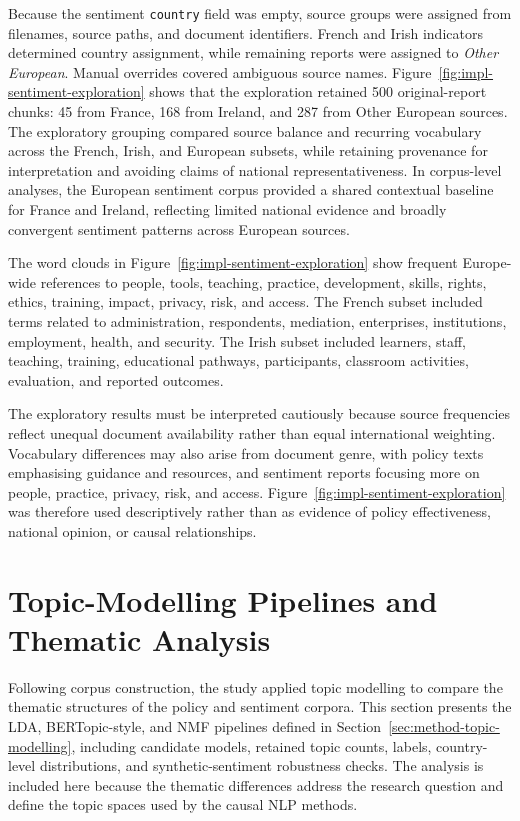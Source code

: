 Because the sentiment \texttt{country} field was empty, source groups were assigned
from filenames, source paths, and document identifiers. French and Irish
indicators determined country assignment, while remaining reports were assigned
to \textit{Other European}. Manual overrides covered ambiguous source names.
Figure~\ref{fig:impl-sentiment-exploration} shows that the exploration retained
500 original-report chunks: 45 from France, 168 from Ireland, and 287 from
Other European sources. The exploratory grouping compared
source balance and recurring vocabulary across the French, Irish, and
European subsets, while retaining provenance for interpretation and avoiding
claims of national representativeness. In corpus-level analyses, the European
sentiment corpus provided a shared contextual baseline for France and Ireland,
reflecting limited national evidence and broadly convergent sentiment patterns
across European sources.

The word clouds in Figure~\ref{fig:impl-sentiment-exploration} show frequent
Europe-wide references to people, tools, teaching, practice, development, skills,
rights, ethics, training, impact, privacy, risk, and access. The French subset
included terms related to administration, respondents, mediation, enterprises,
institutions, employment, health, and security. The Irish subset included learners,
staff, teaching, training, educational pathways, participants, classroom activities,
evaluation, and reported outcomes.

The exploratory results must be interpreted cautiously because source frequencies
reflect unequal document availability rather than equal international weighting.
Vocabulary differences may also arise from document genre, with policy texts
emphasising guidance and resources, and sentiment reports focusing more on people,
practice, privacy, risk, and access. Figure~\ref{fig:impl-sentiment-exploration} was
therefore used descriptively rather than as evidence of policy effectiveness,
national opinion, or causal relationships.


\section{Topic-Modelling Pipelines and Thematic Analysis}
\label{sec:impl-topic-modelling}

Following corpus construction, the study applied topic modelling to compare the
thematic structures of the policy and sentiment corpora. This section presents the
LDA, BERTopic-style, and NMF pipelines defined in
Section~\ref{sec:method-topic-modelling}, including candidate models, retained topic
counts, labels, country-level distributions, and synthetic-sentiment robustness
checks. The analysis is included here because the thematic differences address the
research question and define the topic spaces used by the causal NLP methods.


